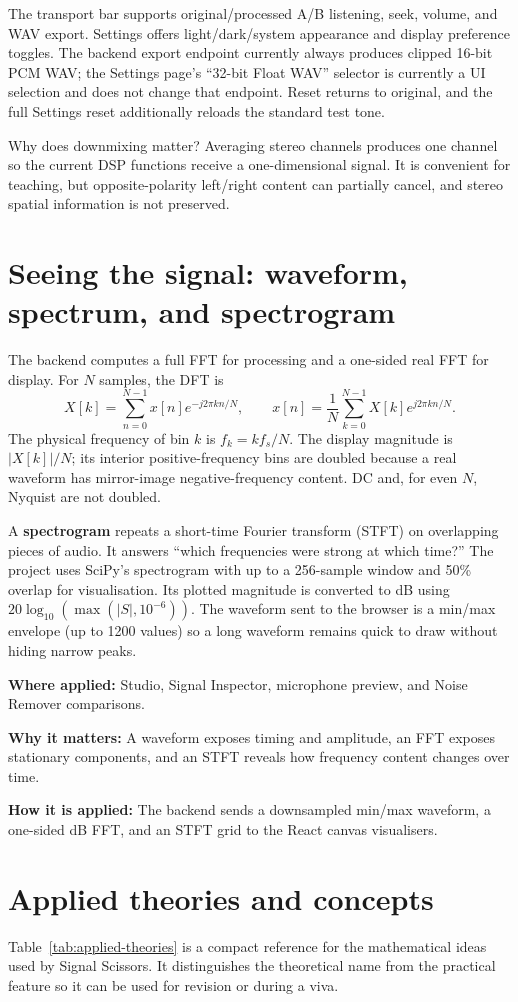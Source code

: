 \documentclass[11pt,a4paper]{article}
\newcommand{\applied}[3]{\begin{tcolorbox}[colback=white,colframe=black!28,boxrule=.3pt,arc=1mm,left=3mm,right=3mm,top=1.8mm,bottom=1.8mm]\small\textbf{Where applied:} #1\par\textbf{Why it matters:} #2\par\textbf{How it is applied:} #3\end{tcolorbox}}
\newcommand{\term}[1]{\textbf{#1}}
\begin{document}
The transport bar supports original/processed A/B listening, seek, volume, and WAV export. Settings offers light/dark/system appearance and display preference toggles. The backend export endpoint currently always produces clipped 16-bit PCM WAV; the Settings page's ``32-bit Float WAV'' selector is currently a UI selection and does not change that endpoint. Reset returns to original, and the full Settings reset additionally reloads the standard test tone.

\begin{viva} Why does downmixing matter? Averaging stereo channels produces one channel so the current DSP functions receive a one-dimensional signal. It is convenient for teaching, but opposite-polarity left/right content can partially cancel, and stereo spatial information is not preserved.
\end{viva}

\section{Seeing the signal: waveform, spectrum, and spectrogram}
The backend computes a full FFT for processing and a one-sided real FFT for display. For \(N\) samples, the DFT is
\[
X[k]=\sum_{n=0}^{N-1}x[n]e^{-j2\pi kn/N},\qquad
x[n]=\frac{1}{N}\sum_{k=0}^{N-1}X[k]e^{j2\pi kn/N}.
\]
The physical frequency of bin \(k\) is \(f_k=kf_s/N\). The display magnitude is \(|X[k]|/N\); its interior positive-frequency bins are doubled because a real waveform has mirror-image negative-frequency content. DC and, for even \(N\), Nyquist are not doubled.

A \term{spectrogram} repeats a short-time Fourier transform (STFT) on overlapping pieces of audio. It answers ``which frequencies were strong at which time?'' The project uses SciPy's spectrogram with up to a 256-sample window and 50\% overlap for visualisation. Its plotted magnitude is converted to dB using \(20\log_{10}(\max(|S|,10^{-6}))\). The waveform sent to the browser is a min/max envelope (up to 1200 values) so a long waveform remains quick to draw without hiding narrow peaks.
\applied{Studio, Signal Inspector, microphone preview, and Noise Remover comparisons.}{A waveform exposes timing and amplitude, an FFT exposes stationary components, and an STFT reveals how frequency content changes over time.}{The backend sends a downsampled min/max waveform, a one-sided dB FFT, and an STFT grid to the React canvas visualisers.}

\section{Applied theories and concepts}
Table~\ref{tab:applied-theories} is a compact reference for the mathematical ideas used by Signal Scissors. It distinguishes the theoretical name from the practical feature so it can be used for revision or during a viva.
\end{document}
